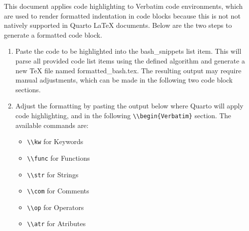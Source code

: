 \documentclass[
  letterpaper,
  DIV=11,
  numbers=noendperiod]{scrartcl}
\author{}
\date{}
\newenvironment{Shaded}{\begin{snugshade}}{\end{snugshade}}
\newcommand{\FunctionTok}[1]{\textcolor[rgb]{0.15,0.55,0.82}{\textbf{#1}}}
\newcommand{\NormalTok}[1]{\textcolor[rgb]{0.20,0.20,0.20}{#1}}
\newcommand{\SpecialCharTok}[1]{\textcolor[rgb]{0.71,0.54,0.00}{\textbf{#1}}}
\providecommand{\tightlist}{%
  \setlength{\itemsep}{0pt}\setlength{\parskip}{0pt}}
\begin{document}
\clearpage
\null
\thispagestyle{empty}
\newpage
\setcounter{page}{1}

This document applies code highlighting to Verbatim code environments,
which are used to render formatted indentation in code blocks because
this is not not natively supported in Quarto LaTeX documents. Below are
the two steps to generate a formatted code block.

\begin{enumerate}
\def\labelenumi{\arabic{enumi}.}
\item
  Paste the code to be highlighted into the bash\_snippets list item.
  This will parse all provided code list items using the defined
  algorithm and generate a new TeX file named formatted\_bash.tex. The
  resulting output may require manual adjustments, which can be made in
  the following two code block sections.
\item
  Adjust the formatting by pasting the output below where Quarto will
  apply code highlighting, and in the following
  \texttt{\textbackslash{}\textbackslash{}begin\{Verbatim\}} section.
  The available commands are:

  \begin{itemize}
  \tightlist
  \item
    \texttt{\textbackslash{}\textbackslash{}kw} for Keywords
  \item
    \texttt{\textbackslash{}\textbackslash{}func} for Functions
  \item
    \texttt{\textbackslash{}\textbackslash{}str} for Strings
  \item
    \texttt{\textbackslash{}\textbackslash{}com} for Comments
  \item
    \texttt{\textbackslash{}\textbackslash{}op} for Operators
  \item
    \texttt{\textbackslash{}\textbackslash{}atr} for Atributes
  \end{itemize}
\end{enumerate}

\begin{Shaded}
\end{Shaded}
\end{document}

